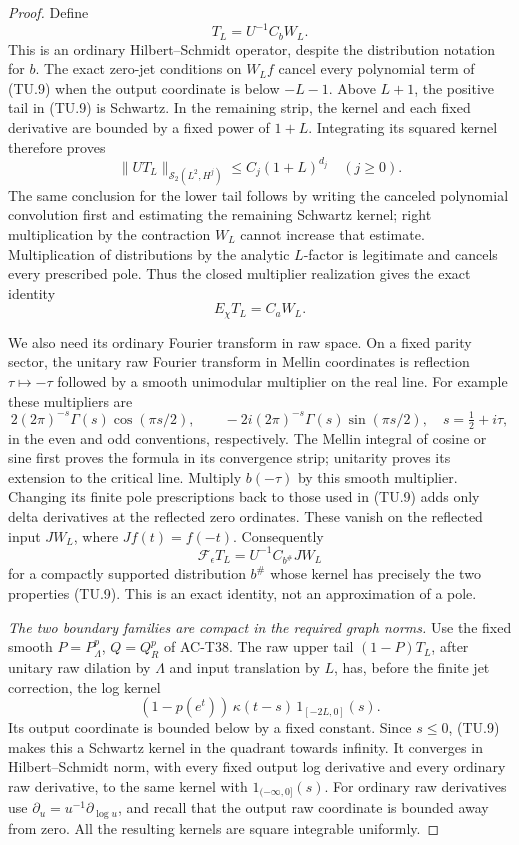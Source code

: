 \begin{proof}
Define
\[
                T_L=U^{-1}C_bW_L.
 \tag{TU.10}
\]
This is an ordinary Hilbert--Schmidt operator, despite the
distribution notation for \(b\).
The exact zero-jet conditions on \(W_Lf\) cancel every
polynomial term of (TU.9) when the output coordinate is
below \(-L-1\).  Above \(L+1\), the positive tail in
(TU.9) is Schwartz.  In the remaining strip, the kernel
and each fixed derivative are bounded by a fixed power of
\(1+L\).  Integrating its squared kernel therefore proves
\[
       \|UT_L\|_{\mathcal S_2(L^2,H^j)}
                    \leq C_j(1+L)^{d_j}\quad(j\geq0).
 \tag{TU.11}
\]
The same conclusion for the lower tail follows by writing
the canceled polynomial convolution first and estimating
the remaining Schwartz kernel; right multiplication by
the contraction \(W_L\) cannot increase that estimate.
Multiplication of distributions by the analytic \(L\)-factor
is legitimate and cancels every prescribed pole.  Thus the
closed multiplier realization gives the exact identity
\[
                         E_\chi T_L=C_aW_L .
 \tag{TU.12}
\]

We also need its ordinary Fourier transform in raw space.
On a fixed parity sector, the unitary raw Fourier transform
in Mellin coordinates is reflection \(\tau\mapsto-\tau\)
followed by a smooth unimodular multiplier on the real line.
For example these multipliers are
\[
 2(2\pi)^{-s}\Gamma(s)\cos(\pi s/2),\qquad
 -2i(2\pi)^{-s}\Gamma(s)\sin(\pi s/2),
                   \quad s=\tfrac12+i\tau ,
 \tag{TU.13}
\]
in the even and odd conventions, respectively.
The Mellin integral of cosine or sine first proves the
formula in its convergence strip; unitarity proves its
extension to the critical line.
Multiply \(b(-\tau)\) by this smooth multiplier.
Changing its finite pole prescriptions back to those used
in (TU.9) adds only delta derivatives at the reflected
zero ordinates.  These vanish on the reflected input
\(JW_L\), where \(Jf(t)=f(-t)\).
Consequently
\[
       \mathcal F_\epsilon T_L=U^{-1}C_{b^\#}JW_L
 \tag{TU.14}
\]
for a compactly supported distribution \(b^\#\) whose
kernel has precisely the two properties (TU.9).
This is an exact identity, not an approximation of a pole.

\emph{The two boundary families are compact in the required graph norms.}
Use the fixed smooth \(P=P_\Lambda^p\), \(Q=Q_R^p\) of
AC-T38.  The raw upper tail \((1-P)T_L\), after unitary
raw dilation by \(\Lambda\) and input translation by \(L\),
has, before the finite jet correction, the log kernel
\[
        (1-p(e^t))\,\kappa(t-s)\,
                              1_{[-2L,0]}(s).
 \tag{TU.15}
\]
Its output coordinate is bounded below by a fixed constant.
Since \(s\leq0\), (TU.9) makes this a Schwartz kernel in
the quadrant towards infinity.
It converges in Hilbert--Schmidt norm, with every fixed
output log derivative and every ordinary raw derivative,
to the same kernel with \(1_{(-\infty,0]}(s)\).
For ordinary raw derivatives use
\(\partial_u=u^{-1}\partial_{\log u}\), and recall
that the output raw coordinate is bounded away from zero.
All the resulting kernels are square integrable uniformly.


\end{proof}
